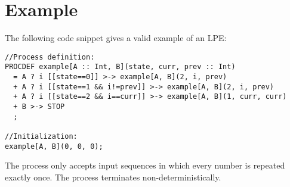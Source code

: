 \section{Example}

The following code snippet gives a valid example of an LPE:

\begin{lstlisting}
//Process definition:
PROCDEF example[A :: Int, B](state, curr, prev :: Int)
  = A ? i [[state==0]] >-> example[A, B](2, i, prev)
  + A ? i [[state==1 && i!=prev]] >-> example[A, B](2, i, prev)
  + A ? i [[state==2 && i==curr]] >-> example[A, B](1, curr, curr)
  + B >-> STOP
  ;

//Initialization:
example[A, B](0, 0, 0);
\end{lstlisting}

The process only accepts input sequences in which every number is repeated exactly once.
The process terminates non-deterministically.
